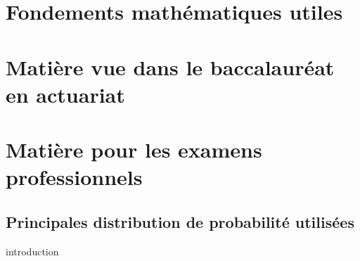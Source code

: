 \documentclass[oneside, 12pt, french]{book}
\begin{document}


\frontmatter %



{
    \hypersetup{linkcolor=tocColor}
    \bfseries %
    \tableofcontents
}
\newpage

\mainmatter %

\part{Fondements mathématiques utiles}


\label{Chapter:NotionCalculs}


\label{Chapter:AlgebreLineaire}


\part{Matière vue dans le baccalauréat en actuariat}


\label{Chapter:ProbEtStatistique}


\label{Chapter:MathematiqueFinanciere}


\label{Chapter:ProcessusAleatoires}


\label{Chapter:TheorieDuRisque}


\part{Matière pour les examens professionnels}


\label{Chapter:SerieChronologique}


\label{Chapter:ExtendedLinearModels}


\label{Chapter:StatisticalLearning}

\appendix
\chapter{Principales distribution de probabilité utilisées}
introduction


\label{Appendix:PreuveImportante}


\label{Appendix:GitWorkflow}
\end{document}

